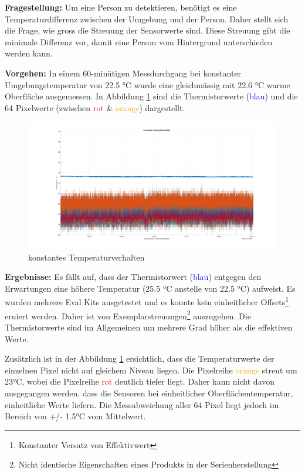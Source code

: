 \textbf{Fragestellung:} Um eine Person zu detektieren, benötigt es eine Temperaturdifferenz zwischen der Umgebung und der Person. Daher stellt sich die Frage, wie gross die Streuung der Sensorwerte sind. Diese Streuung gibt die minimale Differenz vor, damit eine Person vom Hintergrund unterschieden werden kann.

\textbf{Vorgehen:} In einem 60-minütigen Messdurchgang bei konstanter Umgebungstemperatur von 22.5 °C wurde eine gleichmässig mit 22.6 °C warme Oberfläche ausgemessen. In Abbildung \ref{fig:temperaturverhalten} sind die Thermistorwerte (\textcolor{blue}{blau}) und die 64 Pixelwerte (zwischen \textcolor{red}{rot} \& \textcolor{orange}{orange}) dargestellt.
\begin{figure}[H]
	\centering
	\includegraphics[width=1.0\textwidth]{fig/Temperaturverhalten}
	\caption[konstantes Temperaturverhalten]{konstantes Temperaturverhalten}
	\label{fig:temperaturverhalten}
\end{figure}

\textbf{Ergebnisse:} Es fällt auf, dass  der Thermistorwert (\textcolor{blue}{blau}) entgegen den Erwartungen eine höhere Temperatur (25.5 °C anstelle von 22.5 °C) aufweist. Es wurden mehrere Eval Kits ausgetestet und es konnte kein einheitlicher Offsets\footnote[13]{Konstanter Versatz von Effektivwert} eruiert werden. Daher ist von Exemplarstreuungen\footnote[14]{Nicht identische Eigenschaften eines Produkts in der Serienherstellung} auszugehen. Die Thermistorwerte sind im Allgemeinen um mehrere Grad höher als die effektiven Werte. 

Zusätzlich ist in der Abbildung \ref{fig:temperaturverhalten} ersichtlich, dass die Temperaturwerte der einzelnen Pixel nicht auf gleichem Niveau liegen. Die Pixelreihe \textcolor{orange}{orange} streut um 23°C, wobei die Pixelreihe \textcolor{red}{rot} deutlich tiefer liegt. Daher kann nicht davon ausgegangen werden, dass die Sensoren bei einheitlicher Oberflächentemperatur, einheitliche Werte liefern. Die Messabweichung aller 64 Pixel liegt jedoch im Bereich von +/- 1.5°C vom Mittelwert. 

